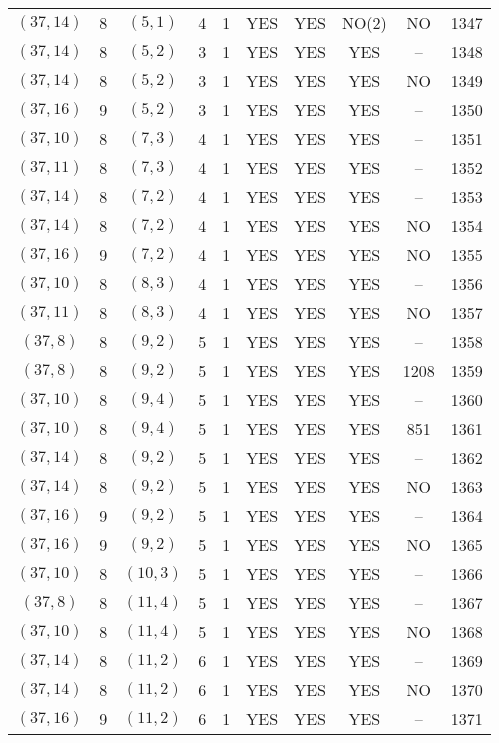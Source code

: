 \begin{longtable}{|c|c|c|c|c|c|c|c|c|c|}
$(37, 14)$ & 8 & $(5, 1)$ & 4 & 1 & YES & YES & NO(2) & NO & 1347\\
$(37, 14)$ & 8 & $(5, 2)$ & 3 & 1 & YES & YES & YES & -- & 1348\\
$(37, 14)$ & 8 & $(5, 2)$ & 3 & 1 & YES & YES & YES & NO & 1349\\
$(37, 16)$ & 9 & $(5, 2)$ & 3 & 1 & YES & YES & YES & -- & 1350\\
$(37, 10)$ & 8 & $(7, 3)$ & 4 & 1 & YES & YES & YES & -- & 1351\\
$(37, 11)$ & 8 & $(7, 3)$ & 4 & 1 & YES & YES & YES & -- & 1352\\
$(37, 14)$ & 8 & $(7, 2)$ & 4 & 1 & YES & YES & YES & -- & 1353\\
$(37, 14)$ & 8 & $(7, 2)$ & 4 & 1 & YES & YES & YES & NO & 1354\\
$(37, 16)$ & 9 & $(7, 2)$ & 4 & 1 & YES & YES & YES & NO & 1355\\
$(37, 10)$ & 8 & $(8, 3)$ & 4 & 1 & YES & YES & YES & -- & 1356\\
$(37, 11)$ & 8 & $(8, 3)$ & 4 & 1 & YES & YES & YES & NO & 1357\\
$(37, 8)$ & 8 & $(9, 2)$ & 5 & 1 & YES & YES & YES & -- & 1358\\
$(37, 8)$ & 8 & $(9, 2)$ & 5 & 1 & YES & YES & YES & 1208 & 1359\\
$(37, 10)$ & 8 & $(9, 4)$ & 5 & 1 & YES & YES & YES & -- & 1360\\
$(37, 10)$ & 8 & $(9, 4)$ & 5 & 1 & YES & YES & YES & 851 & 1361\\
$(37, 14)$ & 8 & $(9, 2)$ & 5 & 1 & YES & YES & YES & -- & 1362\\
$(37, 14)$ & 8 & $(9, 2)$ & 5 & 1 & YES & YES & YES & NO & 1363\\
$(37, 16)$ & 9 & $(9, 2)$ & 5 & 1 & YES & YES & YES & -- & 1364\\
$(37, 16)$ & 9 & $(9, 2)$ & 5 & 1 & YES & YES & YES & NO & 1365\\
$(37, 10)$ & 8 & $(10, 3)$ & 5 & 1 & YES & YES & YES & -- & 1366\\
$(37, 8)$ & 8 & $(11, 4)$ & 5 & 1 & YES & YES & YES & -- & 1367\\
$(37, 10)$ & 8 & $(11, 4)$ & 5 & 1 & YES & YES & YES & NO & 1368\\
$(37, 14)$ & 8 & $(11, 2)$ & 6 & 1 & YES & YES & YES & -- & 1369\\
$(37, 14)$ & 8 & $(11, 2)$ & 6 & 1 & YES & YES & YES & NO & 1370\\
$(37, 16)$ & 9 & $(11, 2)$ & 6 & 1 & YES & YES & YES & -- & 1371\\

\end{longtable}
